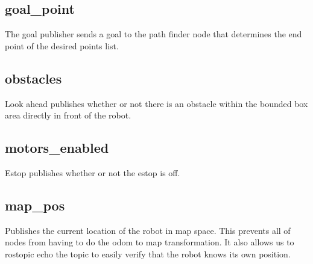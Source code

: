 \subsection{goal\_point}
The goal publisher sends a goal to the path finder node that determines the end point of the desired points list.

\subsection{obstacles}
Look ahead publishes whether or not there is an obstacle within the bounded box area directly in front of the robot.

\subsection{motors\_enabled}
Estop publishes whether or not the estop is off.

\subsection{map\_pos}
Publishes the current location of the robot in map space. This prevents all of nodes from having to do the odom to map transformation. It also allows us to rostopic echo the topic to easily verify that the robot knows its own position.